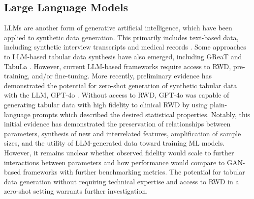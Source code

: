 \subsection{Large Language Models}
LLMs are another form of generative artificial intelligence, which have been applied to synthetic data generation. This primarily includes text-based data, including synthetic interview transcripts \cite{Ham2023} and medical records \cite{CL2024}. Some approaches to LLM-based tabular data synthesis have also emerged, including GReaT \cite{Borisov2022} and TabuLa \cite{Zhao2023}. However, current LLM-based frameworks require access to RWD, pre-training, and/or fine-tuning. More recently, preliminary evidence has demonstrated the potential for zero-shot generation of synthetic tabular data with the LLM, GPT-4o \cite{BarrFAI2025, BarrarXiv2025}. Without access to RWD, GPT-4o was capable of generating tabular data with high fidelity to clinical RWD by using plain-language prompts which described the desired statistical properties. Notably, this initial evidence has demonstrated the preservation of relationships between parameters, synthesis of new and interrelated features, amplification of sample sizes, and the utility of LLM-generated data toward training ML models. However, it remains unclear whether observed fidelity would scale to further interactions between parameters and how performance would compare to GAN-based frameworks with further benchmarking metrics. The potential for tabular data generation without requiring technical expertise and access to RWD in a zero-shot setting warrants further investigation.